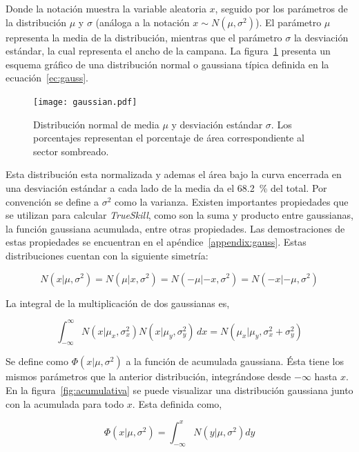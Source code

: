\documentclass[11pt,twoside,spanish]{report} %
\begin{document}
Donde la notaci\'on muestra la variable aleatoria $x$, seguido por los par\'ametros de la distribuci\'on $\mu$ y $\sigma$ (an\'aloga a la notaci\'on $x \sim N(\mu, \sigma^2)$).
El par\'ametro $\mu$ representa la media de la distribuci\'on, mientras que el par\'ametro $\sigma$ la desviaci\'on est\'andar, la cual representa el ancho de la campana.
La figura~\ref{fig:gaus} presenta un esquema gr\'afico de una distribuci\'on normal o gaussiana t\'ipica definida en la ecuaci\'on~\ref{ec:gauss}.

\begin{figure}[H]
	\centering
	\texttt{[image: gaussian.pdf]}
	\caption{Distribuci\'on normal de media $\mu$ y desviaci\'on est\'andar $\sigma$. Los porcentajes representan el porcentaje de \'area correspondiente al sector sombreado.}
	\label{fig:gaus}
\end{figure}


Esta distribuci\'on esta normalizada y ademas el \'area bajo la curva encerrada en una desviaci\'on est\'andar a cada lado de la media da el \SI{68.2}{\percent} del total.
Por convenci\'on se define a $\sigma^2$ como la varianza.
Existen importantes propiedades que se utilizan para calcular \textit{TrueSkill}, como son la suma y producto entre gaussianas, la funci\'on gaussiana acumulada, entre otras propiedades.
Las demostraciones de estas propiedades se encuentran en el ap\'endice~\ref{appendix:gauss}.%
Estas distribuciones cuentan con la siguiente simetr\'ia:


\begin{equation}\label{eq:simetria}
N(x|\mu,\sigma^2) = N(\mu|x,\sigma^2) = N(-\mu|-x,\sigma^2) = N(-x|-\mu,\sigma^2)
\end{equation}

La integral de la multiplicaci\'on de dos gaussianas es,

\begin{equation}\label{eq:multiplicacion_normales}
\int_{-\infty}^{\infty} N(x|\mu_x,\sigma_x^2)N(x|\mu_y,\sigma_y^2) \, dx = N(\mu_x|\mu_y,\sigma_x^2+\sigma_y^2)
\end{equation}

Se define como $\Phi(x|\mu,\sigma^2)$ a la funci\'on de acumulada gaussiana.
\'Esta tiene los mismos par\'ametros que la anterior distribuci\'on, integr\'andose desde $-\infty$ hasta $x$.
En la figura~\ref{fig:acumulativa} se puede visualizar una distribuci\'on gaussiana junto con la acumulada para todo $x$.
Esta definida como,


\begin{equation}\label{eq:phi_norm}
 \Phi(x|\mu,\sigma^2) = \int_{-\infty}^{x}N(y|\mu,\sigma^2)dy
\end{equation}
\end{document}
